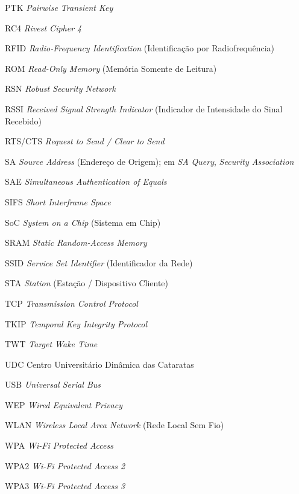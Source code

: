 \begin{siglas}
\item[PTK] \textit{Pairwise Transient Key}
\item[RC4] \textit{Rivest Cipher 4}
\item[RFID] \textit{Radio-Frequency Identification} (Identificação por Radiofrequência)
\item[ROM] \textit{Read-Only Memory} (Memória Somente de Leitura)
\item[RSN] \textit{Robust Security Network}
\item[RSSI] \textit{Received Signal Strength Indicator} (Indicador de Intensidade do Sinal Recebido)
\item[RTS/CTS] \textit{Request to Send / Clear to Send}
\item[SA] \textit{Source Address} (Endereço de Origem); em \textit{SA Query}, \textit{Security Association}
\item[SAE] \textit{Simultaneous Authentication of Equals}
\item[SIFS] \textit{Short Interframe Space}
\item[SoC] \textit{System on a Chip} (Sistema em Chip)
\item[SRAM] \textit{Static Random-Access Memory}
\item[SSID] \textit{Service Set Identifier} (Identificador da Rede)
\item[STA] \textit{Station} (Estação / Dispositivo Cliente)
\item[TCP] \textit{Transmission Control Protocol}
\item[TKIP] \textit{Temporal Key Integrity Protocol}
\item[TWT] \textit{Target Wake Time}
\item[UDC] Centro Universitário Dinâmica das Cataratas
\item[USB] \textit{Universal Serial Bus}
\item[WEP] \textit{Wired Equivalent Privacy}
\item[WLAN] \textit{Wireless Local Area Network} (Rede Local Sem Fio)
\item[WPA] \textit{Wi-Fi Protected Access}
\item[WPA2] \textit{Wi-Fi Protected Access 2}
\item[WPA3] \textit{Wi-Fi Protected Access 3}
\end{siglas}
